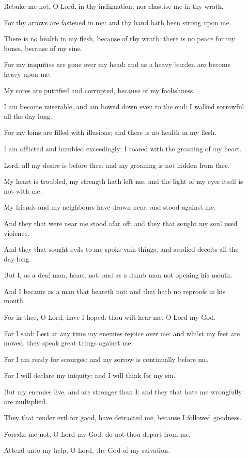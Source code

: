 ﻿\item Rebuke me not, O Lord, in thy indignation; nor chastise me in thy wrath.
\item For thy arrows are fastened in me: and thy hand hath been strong upon me.
\item There is no health in my flesh, because of thy wrath: there is no peace for my bones, because of my sins.
\item For my iniquities are gone over my head: and as a heavy burden are become heavy upon me.
\item My sores are putrified and corrupted, because of my foolishness.
\item I am become miserable, and am bowed down even to the end: I walked sorrowful all the day long.
\item For my loins are filled with illusions; and there is no health in my flesh.
\item I am afflicted and humbled exceedingly: I roared with the groaning of my heart.
\item Lord, all my desire is before thee, and my groaning is not hidden from thee.
\item My heart is troubled, my strength hath left me, and the light of my eyes itself is not with me.
\item My friends and my neighbours have drawn near, and stood against me.
\item And they that were near me stood afar off: and they that sought my soul used violence.
\item And they that sought evils to me spoke vain things, and studied deceits all the day long.
\item But I, as a deaf man, heard not: and as a dumb man not opening his mouth.
\item And I became as a man that heareth not: and that hath no reproofs in his mouth.
\item For in thee, O Lord, have I hoped: thou wilt hear me, O Lord my God.\ifx\enlinebreakaftersixteen\undefined\else\\\fi
\item For I said: Lest at any time my enemies rejoice over me: and whilst my feet are moved, they speak great things against me.
\item For I am ready for scourges: and my sorrow is continually before me.
\item For I will declare my iniquity: and I will think for my sin.
\item But my enemies live, and are stronger than I: and they that hate me wrongfully are multiplied.
\item They that render evil for good, have detracted me, because I followed goodness.
\item Forsake me not, O Lord my God: do not thou depart from me. 
\item Attend unto my help, O Lord, the God of my salvation.
